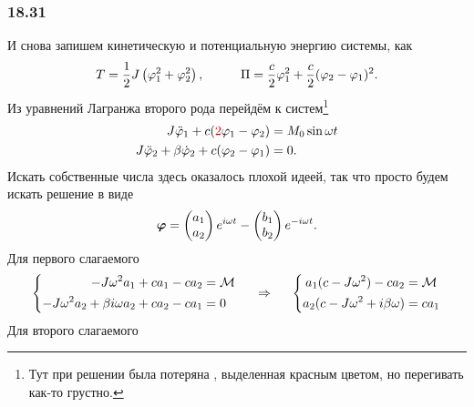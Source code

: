 \subsubsection*{18.31}


И снова запишем кинетическую и потенциальную энергию системы, как
\begin{equation*}
    T = \frac{1}{2} J \left(\varphi_1^2 + \varphi_2^2\right),
    \hspace{1 cm}
    \Pi = \frac{c}{2} \varphi_1^2 + \frac{c}{2}(\varphi_2 - \varphi_1)^2.
\end{equation*}
Из уравнений Лагранжа второго рода перейдём к систем\footnote{
    Тут при решении была потеряна , выделенная красным цветом, но перегивать как-то грустно.
} 
\begin{align*}
    J \ddot{\varphi}_1 + c(\text{\red{2}}\varphi_1 - \varphi_2) &= M_0 \sin \omega t\\
    J \ddot{\varphi}_2 + \beta \dot{\varphi}_2 + c (\varphi_2 - \varphi_1) &= 0.
\end{align*}
Искать собственные числа здесь оказалось плохой идеей, так что просто будем искать решение в виде
\begin{equation*}
    \mbox{\boldmath $\varphi$} = \begin{pmatrix}
        a_1 \\ a_2
    \end{pmatrix} e^{i\omega t} - 
    \begin{pmatrix}
        b_1 \\ b_2
    \end{pmatrix} e^{-i\omega t}.
\end{equation*}
Для первого слагаемого
\begin{equation*}
    \left\{\begin{aligned}
        - J \omega^2 a_1 + c a_1 - c a_2 &= \mathcal M \\
        - J \omega^2 a_2 + \beta i \omega a_2 + c a_2 - c a_1 &= 0
    \end{aligned}\right.
    \hspace{0.5cm} \Rightarrow \hspace{0.5cm}
    \left\{\begin{aligned}
        a_1 (c - J \omega^2) - c a_2 &= \mathcal M \\
        a_2 (c - J \omega^2 + i \beta \omega) &= c a_1
    \end{aligned}\right.
\end{equation*}
Для второго слагаемого
